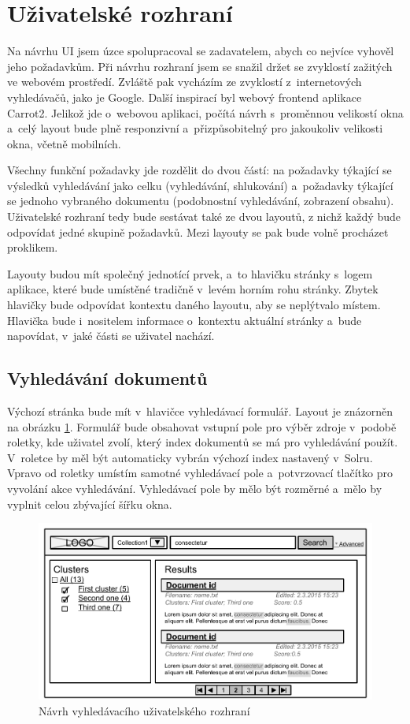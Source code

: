 \section{Uživatelské rozhraní} \label{design_frontend}
Na návrhu UI jsem úzce spolupracoval se zadavatelem, abych co nejvíce vyhověl jeho požadavkům. Při návrhu rozhraní jsem se snažil držet se zvyklostí zažitých ve webovém prostředí. Zvláště pak vycházím ze zvyklostí z~internetových vyhledávačů, jako je Google. Další inspirací byl webový frontend aplikace Carrot2. Jelikož jde o~webovou aplikaci, počítá návrh s~proměnnou velikostí okna a~celý layout bude plně responzivní a~přizpůsobitelný pro jakoukoliv velikosti okna, včetně mobilních.

Všechny funkční požadavky jde rozdělit do dvou částí: na požadavky týkající se výsledků vyhledávání jako celku (vyhledávání, shlukování) a~požadavky týkající se jednoho vybraného dokumentu (podobnostní vyhledávání, zobrazení obsahu). Uživatelské rozhraní tedy bude sestávat také ze dvou layoutů, z nichž každý bude odpovídat jedné skupině požadavků. Mezi layouty se pak bude volně procházet proklikem. 

Layouty budou mít společný jednotící prvek, a~to hlavičku stránky s~logem aplikace, které bude umístěné tradičně v~levém horním rohu stránky. Zbytek hlavičky bude odpovídat kontextu daného layoutu, aby se neplýtvalo místem. Hlavička bude i~nositelem informace o~kontextu aktuální stránky a~bude napovídat, v~jaké části se uživatel nachází.

\subsection{Vyhledávání dokumentů}
Výchozí stránka bude mít v~hlavičce vyhledávací formulář. Layout je znázorněn na obrázku \ref{fig:SearchLayout}. Formulář bude obsahovat vstupní pole pro výběr zdroje v~podobě roletky, kde uživatel zvolí, který index dokumentů se má pro vyhledávání použít. V~roletce by měl být automaticky vybrán výchozí index nastavený v~Solru. Vpravo od roletky umístím samotné vyhledávací pole a~potvrzovací tlačítko pro vyvolání akce vyhledávání. Vyhledávací pole by mělo být rozměrné a~mělo by vyplnit celou zbývající šířku okna.

\begin{figure}[h]
\begin{center}
\includegraphics[width=13cm]{SearchLayout}
\caption{Návrh vyhledávacího uživatelského rozhraní}
\label{fig:SearchLayout}
\end{center}
\end{figure}

